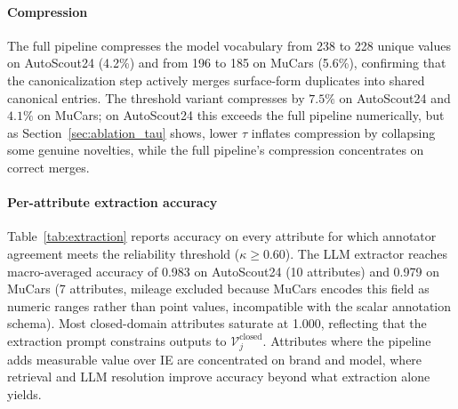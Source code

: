 \documentclass[conference]{IEEEtran}
\begin{document}
\paragraph{Compression}
The full pipeline compresses the model
vocabulary from 238 to 228 unique values on AutoScout24 (4.2\%) and
from 196 to 185 on MuCars (5.6\%), confirming that the canonicalization
step actively merges surface-form duplicates into shared canonical
entries. The threshold variant compresses by $7.5\%$ on AutoScout24
and $4.1\%$ on MuCars; on AutoScout24 this exceeds the full pipeline
numerically, but as Section~\ref{sec:ablation_tau} shows, lower
$\tau$ inflates compression by collapsing some genuine novelties,
while the full pipeline's compression concentrates on correct
merges.

\paragraph{Per-attribute extraction accuracy}
Table~\ref{tab:extraction} reports accuracy on every attribute for
which annotator agreement meets the reliability threshold
($\kappa \geq 0.60$). The LLM extractor reaches macro-averaged
accuracy of 0.983 on AutoScout24 (10 attributes) and 0.979 on
MuCars (7 attributes, mileage excluded because MuCars encodes this
field as numeric ranges rather than point values, incompatible with
the scalar annotation schema). Most closed-domain attributes
saturate at 1.000, reflecting that the extraction prompt constrains
outputs to $\mathcal{V}_j^{\text{closed}}$. Attributes where the
pipeline adds measurable value over IE are concentrated on brand
and model, where retrieval and LLM resolution improve accuracy beyond
what extraction alone yields.
\end{document}
